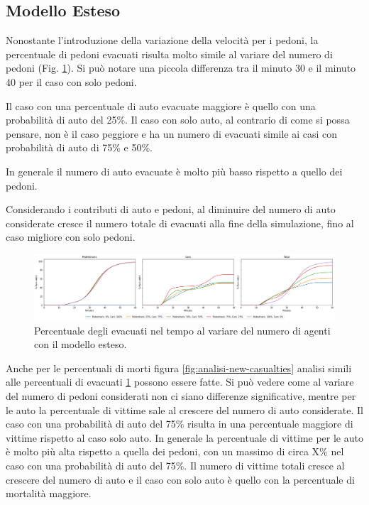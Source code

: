 \pagebreak

\subsection{Modello Esteso}
Nonostante l'introduzione della variazione della velocità per i pedoni, 
la percentuale di pedoni evacuati risulta molto simile al variare del numero di pedoni (Fig. \ref{fig:analisi-new-evacuated}). 
Si può notare una piccola differenza tra il minuto 30 e il minuto 40 per il caso con solo pedoni.

Il caso con una percentuale di auto evacuate maggiore è quello con una probabilità di auto del 25\%.
Il caso con solo auto, al contrario di come si possa pensare, non è il caso peggiore e ha un numero di evacuati simile ai casi 
con probabilità di auto di 75\% e 50\%.
%

In generale il numero di auto evacuate è molto più basso rispetto a quello dei pedoni.

Considerando i contributi di auto e pedoni, al diminuire del numero di auto considerate cresce il numero totale di evacuati alla fine della simulazione,
fino al caso migliore con solo pedoni.

\begin{figure}[ht]
    \centering
    \includegraphics[width=\textwidth]{images/analisi/new-evacuated.png}
    \caption{Percentuale degli evacuati nel tempo al variare del numero di agenti con il modello esteso.}
    \label{fig:analisi-new-evacuated}
\end{figure}

Anche per le percentuali di morti figura \ref{fig:analisi-new-casualties} analisi simili alle percentuali di evacuati \ref*{fig:analisi-new-evacuated} possono essere fatte.
%
Si può vedere come al variare del numero di pedoni considerati non ci siano differenze significative,
mentre per le auto la percentuale di vittime sale al crescere del numero di auto considerate.
Il caso con una probabilità di auto del 75\% risulta in una percentuale maggiore di vittime rispetto al caso solo auto.
In generale la percentuale di vittime per le auto è molto più alta rispetto a quella dei pedoni, con un massimo di circa X\% nel caso con una probabilità di auto del 75\%. 
%
Il numero di vittime totali cresce al crescere del numero di auto e il caso con solo auto è quello con la percentuale di mortalità maggiore.

